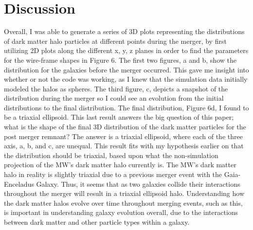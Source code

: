 \documentclass{aastex63}
\begin{document}
\section{Discussion}
Overall, I was able to generate a series of 3D plots representing the distributions of dark matter halo particles at different points during the merger, by first utilizing 2D plots along the different x, y, z planes in order to find the parameters for the wire-frame shapes in Figure 6. The first two figures, a and b, show the distribution for the galaxies before the merger occurred. This gave me insight into whether or not the code was working, as I knew that the simulation data initially modeled the halos as spheres. The third figure, c, depicts a snapshot of the distribution during the merger so I could see an evolution from the initial distributions to the final distribution. The final distribution, Figure 6d, I found to be a triaxial ellipsoid. This last result answers the big question of this paper; what is the shape of the final 3D distribution of the dark matter particles for the post merger remnant? The answer is a triaxial ellipsoid, where each of the three axis, a, b, and c, are unequal. This result fits with my hypothesis earlier on that the distribution should be triaxial, based upon what the non-simulation projection of the MW's dark matter halo currently is. The MW's dark matter halo in reality is slightly triaxial\cite{Law_2010} due to a previous merger event with the Gaia-Enceladus Galaxy. Thus, it seems that as two galaxies collide their interactions throughout the merger will result in a triaxial ellipsoid halo. Understanding how the dark matter halos evolve over time throughout merging events, such as this, is important in understanding galaxy evolution overall, due to the interactions between dark matter and other particle types within a galaxy.
\end{document}
